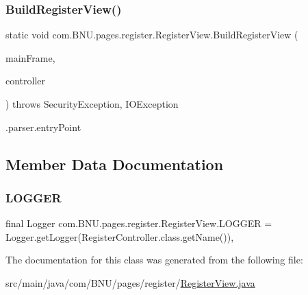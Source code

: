 \subsubsection{\texorpdfstring{Build\+Register\+View()}{BuildRegisterView()}}
{\footnotesize\ttfamily static void com.\+B\+N\+U.\+pages.\+register.\+Register\+View.\+Build\+Register\+View (\begin{DoxyParamCaption}\item[{J\+Frame}]{main\+Frame,  }\item[{\mbox{\hyperlink{classcom_1_1_b_n_u_1_1pages_1_1register_1_1_register_controller}{Register\+Controller}}}]{controller }\end{DoxyParamCaption}) throws Security\+Exception, I\+O\+Exception\hspace{0.3cm}{\ttfamily [static]}}

.parser.\+entry\+Point 

\subsection{Member Data Documentation}
\mbox{\label{classcom_1_1_b_n_u_1_1pages_1_1register_1_1_register_view_a577e161755f31a1e882e40532bbc19cd}} 
\subsubsection{\texorpdfstring{L\+O\+G\+G\+ER}{LOGGER}}
{\footnotesize\ttfamily final Logger com.\+B\+N\+U.\+pages.\+register.\+Register\+View.\+L\+O\+G\+G\+ER = Logger.\+get\+Logger(Register\+Controller.\+class.\+get\+Name())\hspace{0.3cm}{\ttfamily [static]}, {\ttfamily [private]}}



The documentation for this class was generated from the following file\+:\begin{DoxyCompactItemize}
\item 
src/main/java/com/\+B\+N\+U/pages/register/\mbox{\hyperlink{_register_view_8java}{Register\+View.\+java}}\end{DoxyCompactItemize}
